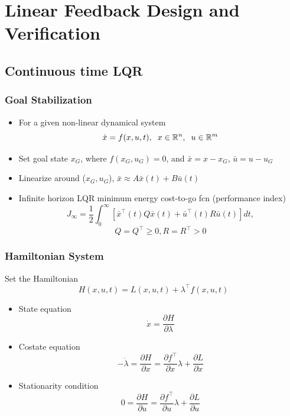 \documentclass{beamer}
\begin{document}
\section{Linear Feedback Design and Verification}

\subsection{Continuous time LQR}

\begin{frame}
\frametitle{Goal Stabilization}
\begin{itemize}
\item For a given non-linear dynamical system
\begin{equation*}
\dot{x} = f(x,u,t), \hspace{.2cm} x\in \mathbb{R}^n, \hspace{.2cm} u\in \mathbb{R}^m 
\end{equation*} 
\item Set goal state $x_G$, where $f(x_G,u_G)=0$, and $\bar{x}=x-x_G$, $\bar{u}=u-u_G$
\item Linearize around ($x_G, u_G$), $\bar{x}\approx A\bar{x}(t)+B\bar{u}(t)$ 
\item Infinite horizon LQR minimum energy cost-to-go fcn (performance index)
\begin{equation*}
J_{\infty}= \frac{1}{2}\int_0^{\infty} [ \bar{x}^{\intercal}(t)Q\bar{x}(t)+\bar{u}^{\intercal}(t)R\bar{u}(t)]dt,
\end{equation*}
\begin{equation*}
Q=Q^{\intercal}\geq 0, R=R^{\intercal}> 0
\end{equation*}
\end{itemize}
\end{frame}


\begin{frame}
\frametitle{Hamiltonian System}
Set the Hamiltonian 
\begin{equation*}
H(x,u,t)= L(x,u,t)+\lambda^{\intercal} f(x,u,t)
\end{equation*} 
\begin{itemize}
\item State equation
\begin{equation*}
\dot{x}=\frac{\partial H}{\partial \lambda}
\end{equation*}
\item Costate equation
\begin{equation*}
-\dot{\lambda} = \frac{\partial H}{\partial x}=\frac{\partial f^{\intercal}}{\partial x}\lambda + \frac{\partial L}{\partial x}
\end{equation*}
\item Stationarity condition
\begin{equation*}
0 = \frac{\partial H}{\partial u}=\frac{\partial f^{\intercal}}{\partial u}\lambda + \frac{\partial L}{\partial u}
\end{equation*}
\end{itemize}
\end{frame}
\end{document}

